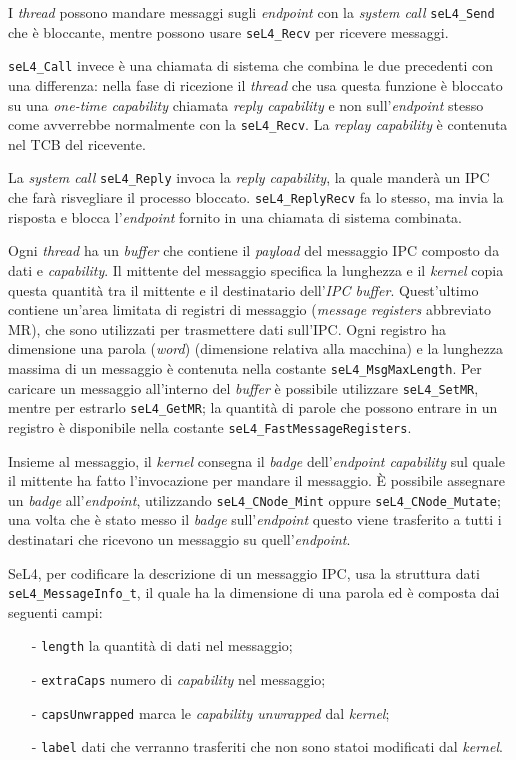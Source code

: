 I \textit{thread} possono mandare messaggi sugli \textit{endpoint} con la \textit{system call} \texttt{seL4\_Send} che è bloccante, mentre possono usare \texttt{seL4\_Recv} per ricevere messaggi.

\texttt{seL4\_Call} invece è una chiamata di sistema che combina le due precedenti con una differenza: nella fase di ricezione il \textit{thread} che usa questa funzione è bloccato su una \textit{one-time capability} chiamata \textit{reply capability} e non sull'\textit{endpoint} stesso come avverrebbe normalmente con la \texttt{seL4\_Recv}. La \textit{replay capability} è contenuta nel TCB del ricevente.

La \textit{system call} \texttt{seL4\_Reply} invoca la \textit{reply capability}, la quale manderà un IPC che farà risvegliare il processo bloccato. \texttt{seL4\_ReplyRecv} fa lo stesso, ma invia la risposta e blocca l'\textit{endpoint} fornito in una chiamata di sistema combinata.

Ogni \textit{thread} ha un \textit{buffer} che contiene il \textit{payload} del messaggio IPC composto da dati e \textit{capability}. Il mittente del messaggio specifica la lunghezza e il \textit{kernel} copia questa quantità tra il mittente e il destinatario dell'\textit{IPC buffer}. Quest'ultimo contiene un'area limitata di registri di messaggio (\textit{message registers} abbreviato MR), che sono utilizzati per trasmettere dati sull'IPC. Ogni registro ha dimensione una parola (\textit{word}) (dimensione relativa alla macchina) e la lunghezza massima di un messaggio è contenuta nella costante \texttt{seL4\_MsgMaxLength}. Per caricare un messaggio all'interno del \textit{buffer} è possibile utilizzare \texttt{seL4\_SetMR}, mentre per estrarlo \texttt{seL4\_GetMR}; la quantità di parole che possono entrare in un registro è disponibile nella costante \texttt{seL4\_FastMessageRegisters}.

Insieme al messaggio, il \textit{kernel} consegna il \textit{badge} dell'\textit{endpoint capability} sul quale il mittente ha fatto l'invocazione per mandare il messaggio. È possibile assegnare un \textit{badge} all'\textit{endpoint}, utilizzando \texttt{seL4\_CNode\_Mint} oppure \texttt{seL4\_CNode\_Mutate}; una volta che è stato messo il \textit{badge} sull'\textit{endpoint} questo viene trasferito a tutti i destinatari che ricevono un messaggio su quell'\textit{endpoint}.

SeL4, per codificare la descrizione di un messaggio IPC, usa la struttura dati \texttt{seL4\_MessageInfo\_t}, il quale ha la dimensione di una parola ed è composta dai seguenti campi:
\begin{itemize}
	\item[-] \texttt{length} la quantità di dati nel messaggio;
	\item[-] \texttt{extraCaps} numero di \textit{capability} nel messaggio;
	\item[-] \texttt{capsUnwrapped} marca le \textit{capability unwrapped} dal \textit{kernel};
	\item[-] \texttt{label} dati che verranno trasferiti che non sono statoi modificati dal \textit{kernel}.
\end{itemize}

